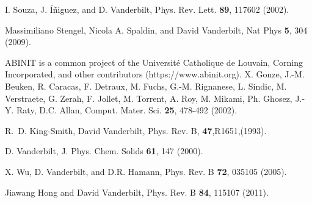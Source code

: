 \documentclass[11pt,fleqn]{article}
\begin{document}
\begin{thebibliography}{99}
I. Souza, J. \'{I}\~{n}iguez, and D. Vanderbilt, Phys. Rev. Lett. {\bf 89},
117602 (2002).

Massimiliano Stengel, Nicola A. Spaldin, and David Vanderbilt,
Nat Phys {\bf 5}, 304 (2009).

  {\sf ABINIT} is a common project of the
  Universit\'{e} Catholique de Louvain, Corning Incorporated, and
  other contributors (https://www.abinit.org).  X. Gonze, J.-M.
  Beuken, R. Caracas, F. Detraux, M. Fuchs, G.-M.  Rignanese, L.
  Sindic, M. Verstraete, G. Zerah, F. Jollet, M. Torrent, A.
  Roy, M. Mikami, Ph. Ghosez, J.-Y. Raty, D.C. Allan, Comput.
  Mater. Sci. {\bf 25}, 478-492 (2002).

R.~D. King-Smith, David Vanderbilt,  Phys. Rev. B, {\bf 47},R1651,(1993).

D. Vanderbilt, J. Phys. Chem. Solids {\bf 61}, 147 (2000).

X. Wu, D. Vanderbilt, and D.R. Hamann, Phys. Rev. B {\bf 72}, 035105 (2005).

 Jiawang Hong and David Vanderbilt, Phys. Rev. B
  {\bf 84}, 115107 (2011).







\end{thebibliography}
\end{document}

